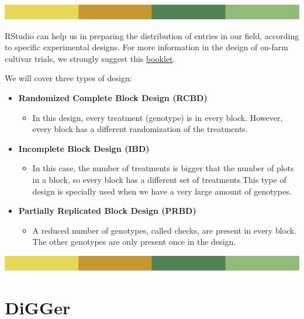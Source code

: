 \documentclass[
]{book}
\providecommand{\tightlist}{%
  \setlength{\itemsep}{0pt}\setlength{\parskip}{0pt}}
\begin{document}
\includegraphics{rsrstrip.png}

RStudio can help us in preparing the distribution of entries in our field, according to specific experimental designs. For more information in the design of on-farm cultivar trials, we strongly suggest this \href{\%22https://www.liveseed.eu/wp-content/uploads/2021/06/LIVESEED-BOOKLET-5_FNL_web.pdf\%22}{booklet}.

We will cover three types of design:

\begin{itemize}
\item
  \textbf{Randomized Complete Block Design (RCBD)}

  \begin{itemize}
  \tightlist
  \item
    In this design, every treatment (genotype) is in every block. However, every block has a different randomization of the treatments.
  \end{itemize}
\item
  \textbf{Incomplete Block Design (IBD)}

  \begin{itemize}
  \tightlist
  \item
    In this case, the number of treatments is bigger that the number of plots in a block, so every block has a different set of treatments.This type of design is specially used when we have a very large amount of genotypes.
  \end{itemize}
\item
  \textbf{Partially Replicated Block Design (PRBD)}

  \begin{itemize}
  \tightlist
  \item
    A reduced number of genotypes, called checks, are present in every block. The other genotypes are only present once in the design.
  \end{itemize}
\end{itemize}

\includegraphics{rsrstrip.png}

\hypertarget{digger}{%
\section{DiGGer}\label{digger}}
\end{document}
